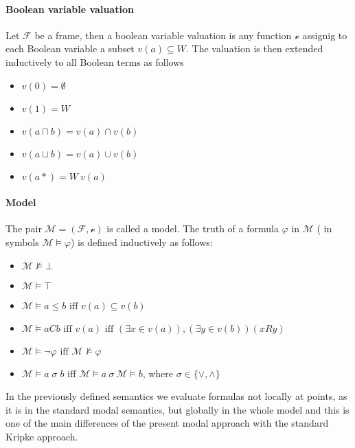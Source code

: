 \documentclass{article}
\begin{document}
	\paragraph{Boolean variable valuation}
Let $\mathcal{F}$  be a frame, then a boolean variable valuation is any function $\mathscr{v}$ assignig to each Boolean variable a subset $v(a) \subseteq W$. The valuation is then extended inductively to all Boolean terms as follows
		\begin{itemize}
			\item $v(0) = \emptyset$
			\item $v(1) = W$
			\item $v(a \sqcap b) = v(a) \cap v(b)$
			\item $v(a \sqcup b) = v(a) \cup v(b)$
			\item $v(a*) = W \ v(a)$
		\end{itemize}

	\paragraph{Model} The pair $\mathcal{M} = (\mathcal{F}, \mathscr{v})$ is called a model. The truth of a formula $\varphi$ in $\mathcal{M}$ ( in symbols $\mathcal{M} \models \varphi$) is defined inductively as follows:
		\begin{itemize}
			\item $\mathcal{M} \not\models \bot$ 
			\item $\mathcal{M} \models \top$
			\item $\mathcal{M} \models a \leq b \text{ iff } v(a) \subseteq v(b)$
			\item $\mathcal{M} \models aCb \text{ iff } v(a) \text{ iff } (\exists x \in v(a)), (\exists y \in v(b)) (xRy)$
			\item $\mathcal{M} \models \neg \varphi \text{ iff } \mathcal{M} \not\models \varphi$
			\item $\mathcal{M} \models a \; \sigma \; b \text{ iff } \mathcal{M} \models a \: \sigma \: \mathcal{M} \models b$, where $\sigma \in \{ \vee, \wedge \}$
		\end{itemize}
In the previously defined semantics we evaluate formulas not locally at points, as it is in the standard modal semantics, but globally in the whole model and this is one of the main differences of the present modal approach with the standard Kripke approach.
\end{document}

